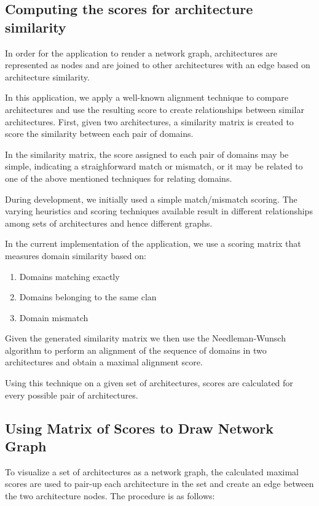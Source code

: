 \subsection{Computing the scores for architecture similarity}

In order for the application to render a network graph, architectures are represented as nodes and are joined to other architectures with an edge based on architecture similarity.

In this application, we apply a well-known alignment technique to compare architectures and use the resulting score to create relationships between similar architectures. First, given two architectures, a similarity matrix is created to score the similarity between each pair of domains. 

In the similarity matrix, the score assigned to each pair of domains may be simple, indicating a straighforward match or mismatch, or it may be related to one of the above mentioned techniques for relating domains.

During development, we initially used a simple match/mismatch scoring. The varying heuristics and scoring techniques available result in different relationships among sets of architectures and hence different graphs.

In the current implementation of the application, we use a scoring matrix that measures domain similarity based on:
\begin{enumerate}
	\item Domains matching exactly
	\item Domains belonging to the same clan
	\item Domain mismatch
\end{enumerate}

Given the generated similarity matrix we then use the Needleman-Wunsch algorithm \cite{nwalgo} to perform an alignment of the sequence of domains in two architectures and obtain a maximal alignment score.

Using this technique on a given set of architectures, scores are calculated for every possible pair of architectures.


\subsection{Using Matrix of Scores to Draw Network Graph}

To visualize a set of architectures as a network graph, the calculated maximal scores are used to pair-up each architecture in the set and create an edge between the two architecture nodes. The procedure is as follows:

